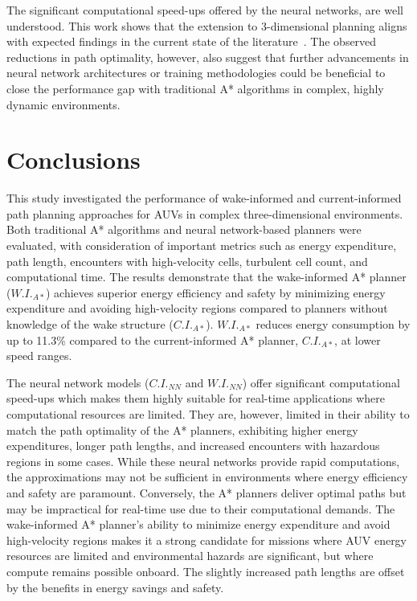 \documentclass[final,5p,times,twocolumn]{elsarticle}
\begin{document}
The significant computational speed-ups offered by the neural networks, are well understood. This work shows that the extension to 3-dimensional planning aligns with expected findings in the current state of the literature~\cite{LeCun2015}. The observed reductions in path optimality, however, also suggest that further advancements in neural network architectures or training methodologies could be beneficial to close the performance gap with traditional A* algorithms in complex, highly dynamic environments.

\section{Conclusions} %
\label{Conclusions}

This study investigated the performance of wake-informed and current-informed path planning approaches for AUVs in complex three-dimensional environments. Both traditional A* algorithms and neural network-based planners were evaluated, with consideration of important metrics such as energy expenditure, path length, encounters with high-velocity cells, turbulent cell count, and computational time. The results demonstrate that the wake-informed A* planner ($W.I._{A*}$) achieves superior energy efficiency and safety by minimizing energy expenditure and avoiding high-velocity regions compared to planners without knowledge of the wake structure ($C.I._{A*}$). $W.I._{A*}$ reduces energy consumption by up to 11.3\% compared to the current-informed A* planner, $C.I._{A*}$, at lower speed ranges.

The neural network models ($C.I._{NN}$ and $W.I._{NN}$) offer significant computational speed-ups which makes them highly suitable for real-time applications where computational resources are limited. They are, however, limited in their ability to match the path optimality of the A* planners, exhibiting higher energy expenditures, longer path lengths, and increased encounters with hazardous regions in some cases. While these neural networks provide rapid computations, the approximations may not be sufficient in environments where energy efficiency and safety are paramount. Conversely, the A* planners deliver optimal paths but may be impractical for real-time use due to their computational demands. The wake-informed A* planner's ability to minimize energy expenditure and avoid high-velocity regions makes it a strong candidate for missions where AUV energy resources are limited and environmental hazards are significant, but where compute remains possible onboard. The slightly increased path lengths are offset by the benefits in energy savings and safety. 
\end{document}
